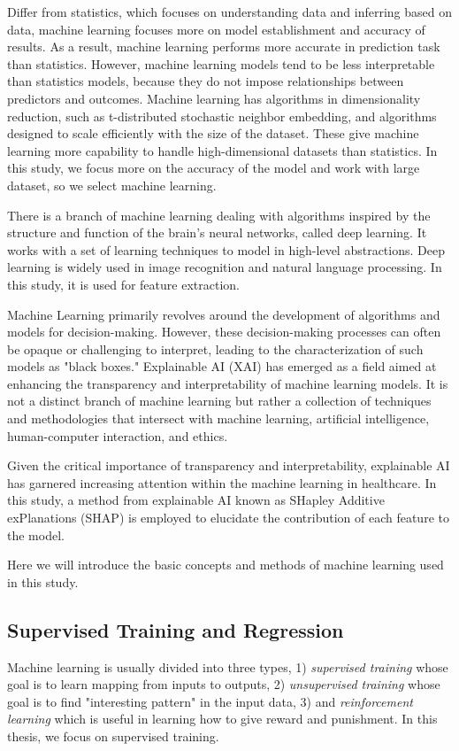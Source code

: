 \documentclass[12pt,a4paper,english
]{tunithesis}
\begin{document}
Differ from statistics, which focuses on understanding data and inferring based on data, machine learning focuses more on model establishment and accuracy of results. As a result, machine learning performs more accurate in prediction task than statistics. However, machine learning models tend to be less interpretable than statistics models, because they do not impose relationships between predictors and outcomes. Machine learning has algorithms in dimensionality reduction, such as t-distributed stochastic neighbor embedding, and algorithms designed to scale efficiently with the size of the dataset. These give machine learning more capability to handle high-dimensional datasets than statistics. \parencite{Bzdok2018, Rajula2020, turin2020} In this study, we focus more on the accuracy of the model and work with large dataset, so we select machine learning.

There is a branch of machine learning dealing with algorithms inspired by the structure and function of the brain's neural networks, called deep learning. It works with a set of learning techniques to model in high-level abstractions. \parencite{kevin2012} Deep learning is widely used in image recognition and natural language processing. In this study, it is used for feature extraction.

Machine Learning primarily revolves around the development of algorithms and models for decision-making. However, these decision-making processes can often be opaque or challenging to interpret, leading to the characterization of such models as "black boxes." Explainable AI (XAI) has emerged as a field aimed at enhancing the transparency and interpretability of machine learning models. It is not a distinct branch of machine learning but rather a collection of techniques and methodologies that intersect with machine learning, artificial intelligence, human-computer interaction, and ethics. \parencite{turri2022}

Given the critical importance of transparency and interpretability, explainable AI has garnered increasing attention within the machine learning in healthcare. In this study, a method from explainable AI known as SHapley Additive exPlanations (SHAP) is employed to elucidate the contribution of each feature to the model.

Here we will introduce the basic concepts and methods of machine learning used in this study. 

\subsection{Supervised Training and Regression}
Machine learning is usually divided into three types, 1) \textit{supervised training} whose goal is to learn mapping from inputs to outputs, 2) \textit{unsupervised training} whose goal is to find "interesting pattern" in the input data, 3) and \textit{reinforcement learning} which is useful in learning how to give reward and punishment. In this thesis, we focus on supervised training.
\end{document}
